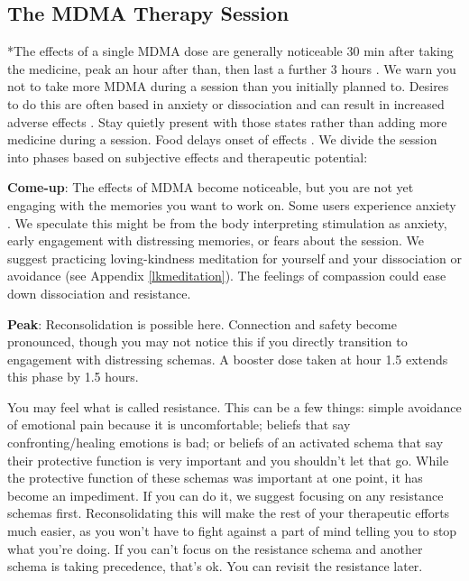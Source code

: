 \documentclass[12pt,letterpaper]{article}
\begin{document}
\subsection{The MDMA Therapy Session}
\label{session}
*The effects of a single MDMA dose are generally noticeable 30 min after taking the medicine, peak an hour after than, then last a further 3 hours \cite{vizeliActuteEffects}. We warn you not to take more MDMA during a session than you initially planned to. Desires to do this are often based in anxiety or dissociation and can result in increased adverse effects \cite{bruntLinking}. Stay quietly present with those states rather than adding more medicine during a session. Food delays onset of effects \cite{MithoeferMDMA}. We divide the session into phases based on subjective effects and therapeutic potential:

\textbf{Come-up}:
The effects of MDMA become noticeable, but you are not yet engaging with the memories you want to work on. Some users experience anxiety \cite{hillsSolo}. We speculate this might be from the body interpreting stimulation as anxiety, early engagement with distressing memories, or fears about the session. We suggest practicing loving-kindness meditation for yourself and your dissociation or avoidance (see Appendix \ref{lkmeditation}). The feelings of compassion could ease down dissociation and resistance.

\textbf{Peak}:
Reconsolidation is possible here. Connection and safety become pronounced, though you may not notice this if you directly transition to engagement with distressing schemas. A booster dose taken at hour 1.5 extends this phase by 1.5 hours.

You may feel what is called resistance. This can be a few things: simple avoidance of emotional pain because it is uncomfortable; beliefs that say confronting/healing emotions is bad; or beliefs of an activated schema that say their protective function is very important and you shouldn't let that go. While the protective function of these schemas was important at one point, it has become an impediment. If you can do it, we suggest focusing on any resistance schemas first. Reconsolidating this will make the rest of your therapeutic efforts much easier, as you won't have to fight against a part of mind telling you to stop what you're doing. If you can't focus on the resistance schema and another schema is taking precedence, that's ok. You can revisit the resistance later.
\end{document}
